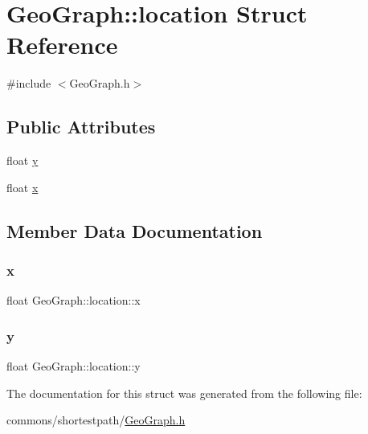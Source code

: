 \hypertarget{struct_geo_graph_1_1location}{}\section{Geo\+Graph\+::location Struct Reference}
\label{struct_geo_graph_1_1location}


{\ttfamily \#include $<$Geo\+Graph.\+h$>$}

\subsection*{Public Attributes}
\begin{DoxyCompactItemize}
\item 
float \mbox{\hyperlink{struct_geo_graph_1_1location_a2fc49e120fa092c2b512c58f148c0e39}{y}}
\item 
float \mbox{\hyperlink{struct_geo_graph_1_1location_aad87af199f3d3d17986f0b4b8c6cef07}{x}}
\end{DoxyCompactItemize}


\subsection{Member Data Documentation}
\mbox{\label{struct_geo_graph_1_1location_aad87af199f3d3d17986f0b4b8c6cef07}} 
\subsubsection{\texorpdfstring{x}{x}}
{\footnotesize\ttfamily float Geo\+Graph\+::location\+::x}

\mbox{\label{struct_geo_graph_1_1location_a2fc49e120fa092c2b512c58f148c0e39}} 
\subsubsection{\texorpdfstring{y}{y}}
{\footnotesize\ttfamily float Geo\+Graph\+::location\+::y}



The documentation for this struct was generated from the following file\+:\begin{DoxyCompactItemize}
\item 
commons/shortestpath/\mbox{\hyperlink{_geo_graph_8h}{Geo\+Graph.\+h}}\end{DoxyCompactItemize}

